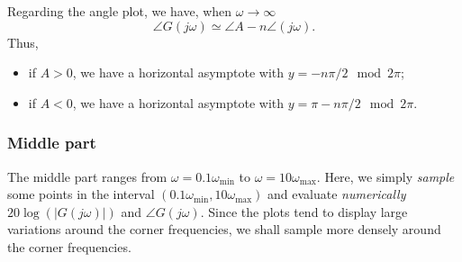 \documentclass[a4paper,11pt]{report}
\theoremstyle{definition}
\begin{document}
Regarding the angle plot, we have, when $\omega\to \infty$
\[
\angle G(j\omega) \simeq \angle A - n\angle(j\omega).
\]
Thus, 
\begin{itemize}
\item if $A>0$, we have a horizontal asymptote with
$y=-n\pi/2 \mod 2\pi$;
\item  if $A<0$, we have a horizontal asymptote with
$y=\pi-n\pi/2\mod 2\pi$.
\end{itemize}


\subsubsection{Middle part}

The middle part ranges from $\omega=0.1\omega_{\min}$ to
$\omega=10\omega_{\max}$. Here, we simply \emph{sample} some points in
the interval $(0.1\omega_{\min},10\omega_{\max})$ and evaluate
\emph{numerically} $20\log(|G(j\omega)|)$ and $\angle
G(j\omega)$. Since the plots tend to display large variations around
the corner frequencies, we shall sample more densely around the corner
frequencies.
\end{document}

